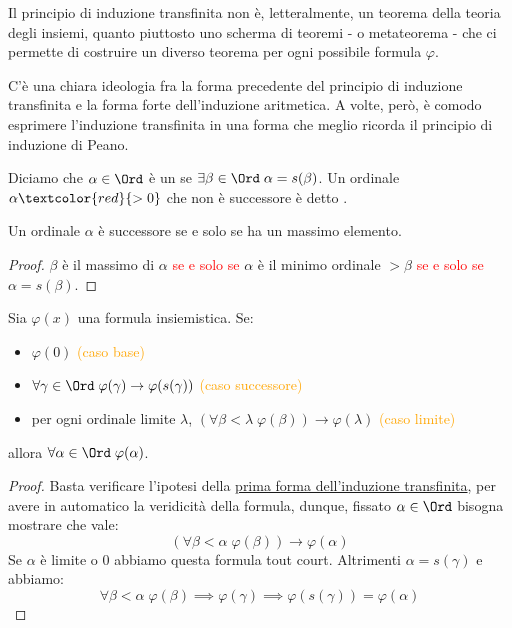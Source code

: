 \documentclass[11pt]{scrartcl}
\begin{document}
\begin{note}
	Il principio di induzione transfinita non è, letteralmente, un teorema della teoria degli insiemi, quanto piuttosto uno scherma di teoremi - o metateorema - che ci permette 
	di costruire un diverso teorema per ogni possibile formula $\varphi$.
\end{note}

C'è una chiara ideologia fra la forma precedente del principio di induzione transfinita e la forma forte dell'induzione aritmetica.
A volte, però, è comodo esprimere l'induzione transfinita in una forma che meglio ricorda il principio di induzione di Peano.

\begin{definition}
	Diciamo che $\alpha \in \Ord$ è un  se $\exists \beta \in \Ord \; \alpha = s(\beta)$. Un ordinale $\alpha \textcolor{red}{>0}$
	che non è successore è detto .
\end{definition}

\begin{remark}
	Un ordinale $\alpha$ è successore se e solo se ha un massimo elemento.
\end{remark}

\begin{proof}
	$\beta$ è il massimo di $\alpha$ \textcolor{red}{se e solo se} $\alpha$ è il minimo ordinale $>\beta$ \textcolor{red}{se e solo se} $\alpha = s(\beta)$.
\end{proof}

\begin{proposition}
	\label{induz_transf2}
	Sia $\varphi(x)$ una formula insiemistica. Se:
	\begin{itemize}
		\item $\varphi(0)$ \textcolor{orange}{(caso base)}
		\item $\forall \gamma \in \Ord \; \varphi(\gamma) \rightarrow \varphi(s(\gamma))$ \textcolor{orange}{(caso successore)}
		\item per ogni ordinale limite $\lambda$, $(\forall \beta < \lambda \; \varphi(\beta)) \rightarrow \varphi(\lambda)$ \textcolor{orange}{(caso limite)}
	\end{itemize}
	allora $\forall \alpha \in \Ord \; \varphi(\alpha)$.
\end{proposition}

\begin{proof}
	Basta verificare l'ipotesi della \hyperref[induz_transf1]{prima forma dell'induzione transfinita}, per avere in automatico la veridicità della formula, dunque, fissato $\alpha \in \Ord$ bisogna mostrare che vale:
	\[ (\forall \beta < \alpha \; \varphi(\beta)) \rightarrow \varphi(\alpha)
		\]
	Se $\alpha$ è limite o $0$ abbiamo questa formula tout court. Altrimenti $\alpha = s(\gamma)$ e abbiamo:
	\[ \forall \beta < \alpha \; \varphi(\beta) \implies \varphi(\gamma) \implies \varphi(s(\gamma)) = \varphi(\alpha)
		\]
\end{proof}
\end{document}

